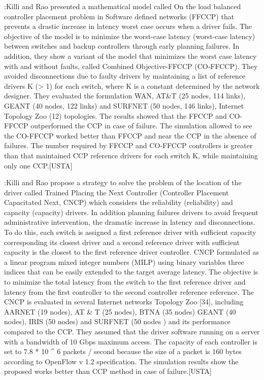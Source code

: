 \documentclass[a4paper,10pt]{article}
\begin{document}
\cite{KiRa16}:Killi and Rao presented a mathematical model called On the load balanced controller placement problem in Software defined networks (FFCCP) that prevents a drastic increase in latency worst case occurs when a driver fails. The objective of the model is to minimize the worst-case latency (worst-case latency) between switches and backup controllers through early planning failures. In addition, they show a variant of the model that minimizes the worst case latency with and without faults, called Combined Objective-FFCCP (CO-FFCCP). They avoided disconnections due to faulty drivers by maintaining a list of reference drivers K (> 1) for each switch, where K is a constant determined by the network designer.
They evaluated the formulation WAN, AT&T (25 nodes, 114 links), GEANT (40 nodes, 122 links) and SURFNET (50 nodes, 146 links), Internet Topology Zoo (12) topologies. The results showed that the FFCCP and CO-FFCCP outperformed the CCP in case of failure. The simulation allowed to see the CO-FFCCP worked better than FFCCP and near the CCP in the absence of failures. The number required by FFCCP and CO-FFCCP controllers is greater than that maintained CCP reference drivers for each switch K, while maintaining only one CCP.[USTA]

\cite{KiRa17}:Killi and Rao propose a strategy to solve the problem of the location of the driver called Trained Placing the Next Controller (Controller Placement Capacitated Next, CNCP) which considers the reliability (reliability) and capacity (capacity) drivers. In addition planning failures drivers to avoid frequent administrative intervention, the dramatic increase in latency and disconnections. To do this, each switch is assigned a first reference driver with sufficient capacity corresponding its closest driver and a second reference driver with sufficient capacity is the closest to the first reference driver controller. CNCP formulated as a linear program mixed integer numbers (MILP) using binary variables three indices that can be easily extended to the target average latency. The objective is to minimize the total latency from the switch to the first reference driver and latency from the first controller to the second controller reference reference.
The CNCP is evaluated in several Internet networks Topology Zoo [34], including AARNET (19 nodes), AT & T (25 nodes), BTNA (35 nodes) GEANT (40 nodes), IRIS (50 nodes) and SURFNET (50 nodes ) and its performance compared to the CCP.
They assumed that the driver software running on a server with a bandwidth of 10 Gbps maximum access. The capacity of each controller is set to 7.8 * 10 ^ 6 packets / second because the size of a packet is 160 bytes according to OpenFlow v 1.2 specification.
The simulation results show the proposed works better than CCP method in case of failure.[USTA]
\end{document}
